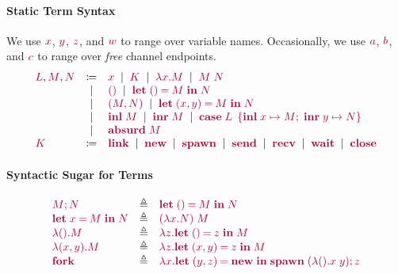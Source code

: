 \documentclass[main.tex]{subfiles}
\begin{document}
\paragraph*{Static Term Syntax}
We use $\tm{x}$, $\tm{y}$, $\tm{z}$, and $\tm{w}$ to range over variable names. Occasionally, we use $\tm{a}$, $\tm{b}$, and $\tm{c}$ to range over \emph{free} channel endpoints.
\[
\begin{array}{lcl}
  \tm{L}, \tm{M}, \tm{N}
  & \coloneqq & \tm{x}
    \sep        \tm{K}
    \sep        \tm{\lambda x.M}
    \sep        \tm{M\;N} \\
  & \sep      & \tm{\unit}
    \sep        \tm{\letunit{M}{N}} \\
  & \sep      & \tm{\pair{M}{N}}
    \sep        \tm{\letpair{x}{y}{M}{N}} \\
  & \sep      & \tm{\inl{M}}
    \sep        \tm{\inr{M}}
    \sep        \tm{\casesum{L}{x}{M}{y}{N}} \\
  & \sep      & \tm{\absurd{M}} \\
  \tm{K}
  & \coloneqq & \tm{\link}
    \sep        \tm{\new}
    \sep        \tm{\spawn}
    \sep        \tm{\send}
    \sep        \tm{\recv}
    \sep        \tm{\wait}
    \sep        \tm{\close}
\end{array}
\]

\paragraph*{Syntactic Sugar for Terms}
\[
\begin{array}{lcl}
  \tm{\andthen{M}{N}}
  & \elabarrow & \tm{\letunit{M}{N}} \\
  \tm{\letbind{x}{M}{N}}
  & \elabarrow & \tm{(\lambda x.N)\;M} \\
  \tm{\lambda\unit.M}
  & \elabarrow & \tm{\lambda z.\letunit{z}{M}} \\
  \tm{\lambda\pair{x}{y}.M}
  & \elabarrow & \tm{\lambda z.\letpair{x}{y}{z}{M}} \\
  \tm{\fork}
  & \elabarrow & \tm{\lambda x.\letpair{y}{z}{\new}{\andthen{\spawn\;{(\lambda\unit.x\;y)}}{z}}}
\end{array}
\]
\end{document}
